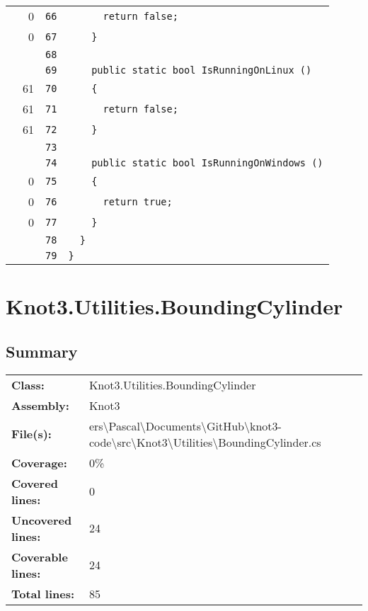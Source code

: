 \documentclass[a4paper,10pt]{article}
\begin{document}
\begin{longtable}[l]{lrrl}
\cellcolor{red} & 0 & \verb~66~ & \verb~      return false;~\\
\cellcolor{red} & 0 & \verb~67~ & \verb~    }~\\
\cellcolor{gray} &  & \verb~68~ & \verb~~\\
\cellcolor{gray} &  & \verb~69~ & \verb~    public static bool IsRunningOnLinux ()~\\
\cellcolor{green} & 61 & \verb~70~ & \verb~    {~\\
\cellcolor{green} & 61 & \verb~71~ & \verb~      return false;~\\
\cellcolor{green} & 61 & \verb~72~ & \verb~    }~\\
\cellcolor{gray} &  & \verb~73~ & \verb~~\\
\cellcolor{gray} &  & \verb~74~ & \verb~    public static bool IsRunningOnWindows ()~\\
\cellcolor{red} & 0 & \verb~75~ & \verb~    {~\\
\cellcolor{red} & 0 & \verb~76~ & \verb~      return true;~\\
\cellcolor{red} & 0 & \verb~77~ & \verb~    }~\\
\cellcolor{gray} &  & \verb~78~ & \verb~  }~\\
\cellcolor{gray} &  & \verb~79~ & \verb~}~\\
\end{longtable}
\newpage
\section{Knot3.Utilities.BoundingCylinder}
\subsection{Summary}
\begin{longtable}[l]{ll}
\textbf{Class:} & Knot3.Utilities.BoundingCylinder\\
\textbf{Assembly:} & Knot3\\
\textbf{File(s):} & \begin{minipage}[t]{12cm}{ers\textbackslash Pascal\textbackslash Documents\textbackslash GitHub\textbackslash knot3-code\textbackslash src\textbackslash Knot3\textbackslash Utilities\textbackslash BoundingCylinder.cs}\end{minipage} \\
\textbf{Coverage:} & 0\%\\
\textbf{Covered lines:} & 0\\
\textbf{Uncovered lines:} & 24\\
\textbf{Coverable lines:} & 24\\
\textbf{Total lines:} & 85\\
\end{longtable}
\end{document}
